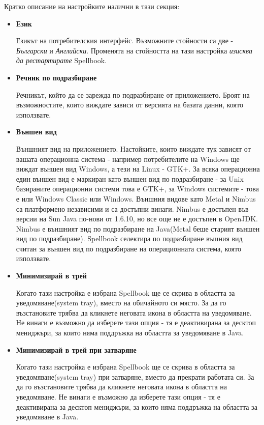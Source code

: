 Кратко описание на настройките налични в тази секция:
\begin{itemize}
  \item \textbf{Език}

    Езикът на потребителския интерфейс. Възможните стойности са две -
    \emph{Български} и \emph{Английски}. Променята на стойността на тази настройка
    \emph{изисква да рестартирате} Spellbook. 
  \item \textbf{Речник по подразбиране}

    Речникът, който да се зарежда по подразбиране от
    приложението. Броят на възможностите, които виждате зависи от
    версията на базата данни, която използвате.
  \item \textbf{Външен вид}

    Външният вид на приложението. Настойките, които виждате тук
    зависят от вашата операционна система - например потребителите на
    Windows ще виждат външен вид Windows, а тези на Linux - GTK+. За
    всяка операционна един външен вид е маркиран като външен вид по
    подразбиране - за Unix базираните операционни системи това е GTK+,
    за Windows системите - това е или Windows Classic или Windows. 
    Външния видове като Metal и Nimbus са платформено независими и са
    достъпни винаги. Nimbus е достъпен във версии на Sun Java по-нови
    от 1.6.10, но все още не е достъпен в OpenJDK. Nimbus е външният
    вид по подразбиране на Java(Metal беше старият външен вид по
    подразбиране). Spellbook селектира по подразбиране въшния вид
    считан за външен вид по подразбиране на операционната система,
    която използвате. 
  \item \textbf{Минимизирай в трей}
    
    Когато тази настройка е избрана Spellbook ще се скрива в областта
    за уведомяване(system tray), вместо на обичайното си място. За да
    го възстановите трябва да кликнете неговата икона в областта на
    уведомяване. Не винаги е възможно да изберете тази опция - тя е
    деактивирана за десктоп мениджъри, за които няма поддръжка на
    областта за уведомяване в Java.
  \item \textbf{Минимизирай в трей при затваряне} 

    Когато тази настройка е избрана Spellbook ще се скрива в областта
    за уведомяване(system tray) при затваряне, вместо да прекрати
    работата си. За да го възстановите трябва да кликнете неговата
    икона в областта на уведомяване. Не винаги е възможно да изберете
    тази опция - тя е деактивирана за десктоп мениджъри, за които няма
    поддръжка на областта за уведомяване в Java.


\end{itemize}
